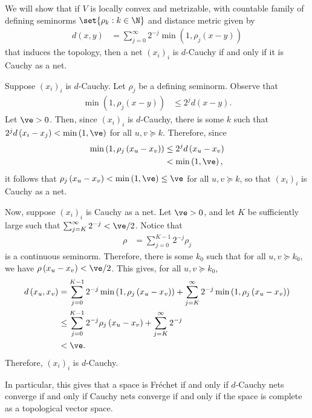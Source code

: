 \documentclass[10pt]{mypackage}
\begin{document}
\begin{solution}
  We will show that if $V$ is locally convex and metrizable, with countable family of defining seminorms $\set{\rho_k : k\in \N}$ and distance metric given by
  \begin{align*}
    d\left( x,y \right) &= \sum_{j=0}^{\infty} 2^{-j} \min\left( 1,\rho_j\left( x-y \right) \right)
  \end{align*}
  that induces the topology, then a net $\left( x_i \right)_i$ is $d$-Cauchy if and only if it is Cauchy as a net.

  Suppose $\left( x_i \right)_i$ is $d$-Cauchy. Let $\rho_j$ be a defining seminorm. Observe that
  \begin{align*}
    \min\left( 1,\rho_j\left( x-y \right) \right) &\leq 2^{j} d\left( x-y \right).
  \end{align*}
  Let $\ve > 0$. Then, since $\left( x_i \right)_i$ is $d$-Cauchy, there is some $k$ such that $2^{j}d\left( x_i-x_j \right) < \min\left( 1,\ve \right)$ for all $u,v\succeq k$. Therefore, since 
  \begin{align*}
    \min\left( 1,\rho_j\left( x_u-x_v \right) \right)&\leq 2^{j}d\left( x_u-x_v \right)\\
                                                     &< \min\left( 1,\ve \right),
  \end{align*}
  it follows that $\rho_j\left( x_u-x_v \right) < \min\left( 1,\ve \right) \leq \ve$ for all $u,v\succeq k$, so that $\left( x_i \right)_i$ is Cauchy as a net.

  Now, suppose $\left( x_i \right)_i$ is Cauchy as a net. Let $\ve > 0$, and let $K$ be sufficiently large such that $\sum_{j=K}^{\infty}2^{-j} < \ve/2$. Notice that
  \begin{align*}
    \rho &= \sum_{j=0}^{K-1} 2^{-j} \rho_j
  \end{align*}
  is a continuous seminorm. Therefore, there is some $k_0$ such that for all $u,v\succeq k_0$, we have $\rho\left( x_u-x_v \right) < \ve/2$. This gives, for all $u,v\succeq k_0$,
  \begin{align*}
    d\left( x_u,x_v \right) &= \sum_{j=0}^{K-1} 2^{-j}\min\left( 1,\rho_j\left( x_u-x_v \right) \right) + \sum_{j=K}^{\infty}2^{-j}\min\left( 1,\rho_j\left( x_u-x_v \right) \right)\\
                            &\leq \sum_{j=0}^{K-1}2^{-j}\rho_j\left( x_u-x_v \right) + \sum_{j=K}^{\infty} 2^{-j}\\
                            &< \ve.
  \end{align*}
  Therefore, $\left( x_i \right)_i$ is $d$-Cauchy.

  In particular, this gives that a space is Fréchet if and only if $d$-Cauchy nets converge if and only if Cauchy nets converge if and only if the space is complete as a topological vector space.
\end{solution}
\end{document}
